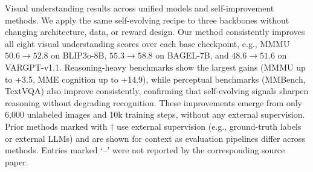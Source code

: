 \begin{table}[t]
  \caption{Visual understanding results across unified models and self-improvement methods. We apply the same self-evolving recipe to three backbones without changing architecture, data, or reward design. Our method consistently improves all eight visual understanding scores over each base checkpoint, e.g., MMMU $50.6{\to}52.8$ on BLIP3o-8B, $55.3{\to}58.8$ on BAGEL-7B, and $48.6{\to}51.6$ on VARGPT-v1.1. Reasoning-heavy benchmarks show the largest gains (MMMU up to +3.5, MME cognition up to +14.9), while perceptual benchmarks (MMBench, TextVQA) also improve consistently, confirming that self-evolving signals sharpen reasoning without degrading recognition. These improvements emerge from only 6{,}000 unlabeled images and 10k training steps, without any external supervision. Prior methods marked with $\dagger$ use external supervision (e.g., ground-truth labels or external LLMs) and are shown for context as evaluation pipelines differ across methods. Entries marked `--' were not reported by the corresponding source paper.}
  \label{tab:understanding_results}
  \centering
  \small


\end{table}
